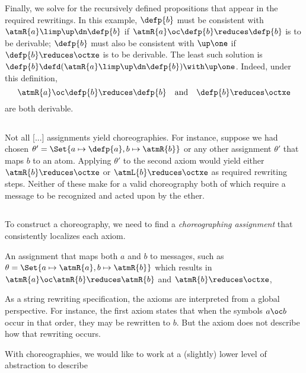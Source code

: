 Finally, we solve for the recursively defined propositions that appear in the required rewritings.
In this example, $\defp{b}$ must be consistent with $\atmR{a} \limp \up \dn \defp{b}$ if $\atmR{a} \oc \defp{b} \reduces \defp{b}$ is to be derivable;
$\defp{b}$ must also be consistent with $\up \one$ if $\defp{b} \reduces \octxe$ is to be derivable.
The least such solution is $\defp{b} \defd (\atmR{a} \limp \up \dn \defp{b}) \with \up \one$.
Indeed, under this definition, 
\begin{equation*}
  \atmR{a} \oc \defp{b} \reduces \defp{b}
  \quad\text{and}\quad
  \defp{b} \reduces \octxe
\end{equation*}
are both derivable.

\clearpage
\subsection{}

Not all [...] assignments yield choreographies.
For instance, suppose we had chosen $\theta' = \Set{a \mapsto \defp{a} , b \mapsto \atmR{b}}$ or any other assignment $\theta'$ that maps $b$ to an atom.
Applying $\theta'$ to the second axiom would yield either $\atmR{b} \reduces \octxe$ or $\atmL{b} \reduces \octxe$ as required rewriting steps.
Neither of these make for a valid choreography both of which require a message to be recognized and acted upon by the ether.


\subsection{}

To construct a choreography, we need to find a \emph{choreographing assignment} that consistently localizes each axiom.

An assignment that maps both $a$ and $b$ to messages, such as $\theta = \Set{a \mapsto \atmR{a} , b \mapsto \atmR{b}}$ which results in $\atmR{a} \oc \atmR{b} \reduces \atmR{b}$  and $\atmR{b} \reduces \octxe$,
 

  
As a string rewriting specification, the axioms are interpreted from a global perspective.
For instance, the first axiom states that when the symbols $a \oc b$ occur in that order, they may be rewritten to $b$.
But the axiom does not describe how that rewriting occurs.

With choreographies, we would like to work at a (slightly) lower level of abstraction to describe 


